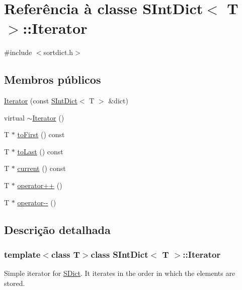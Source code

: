 \hypertarget{class_s_int_dict_1_1_iterator}{\section{Referência à classe S\-Int\-Dict$<$ T $>$\-:\-:Iterator}
\label{class_s_int_dict_1_1_iterator}
}


{\ttfamily \#include $<$sortdict.\-h$>$}

\subsection*{Membros públicos}
\begin{DoxyCompactItemize}
\item 
\hyperlink{class_s_int_dict_1_1_iterator_a3e86eb187d55fed1b0e6d352e834df8c}{Iterator} (const \hyperlink{class_s_int_dict}{S\-Int\-Dict}$<$ T $>$ \&dict)
\item 
virtual \hyperlink{class_s_int_dict_1_1_iterator_a47b331bac1d130f2bab2c40e76ccb54a}{$\sim$\-Iterator} ()
\item 
T $\ast$ \hyperlink{class_s_int_dict_1_1_iterator_ade77b001f496006e7017c1ec8620aeb3}{to\-First} () const 
\item 
T $\ast$ \hyperlink{class_s_int_dict_1_1_iterator_a72d0e5c78c00ed44b21f29f12ae487e0}{to\-Last} () const 
\item 
T $\ast$ \hyperlink{class_s_int_dict_1_1_iterator_ae616144a9897ce6137bce90597583bab}{current} () const 
\item 
T $\ast$ \hyperlink{class_s_int_dict_1_1_iterator_a47eb98449264b3d96cf72c29fa3e9049}{operator++} ()
\item 
T $\ast$ \hyperlink{class_s_int_dict_1_1_iterator_af941a0327bceddd0cbce3539c100d54d}{operator-\/-\/} ()
\end{DoxyCompactItemize}


\subsection{Descrição detalhada}
\subsubsection*{template$<$class T$>$class S\-Int\-Dict$<$ T $>$\-::\-Iterator}

Simple iterator for \hyperlink{class_s_dict}{S\-Dict}. It iterates in the order in which the elements are stored. 

